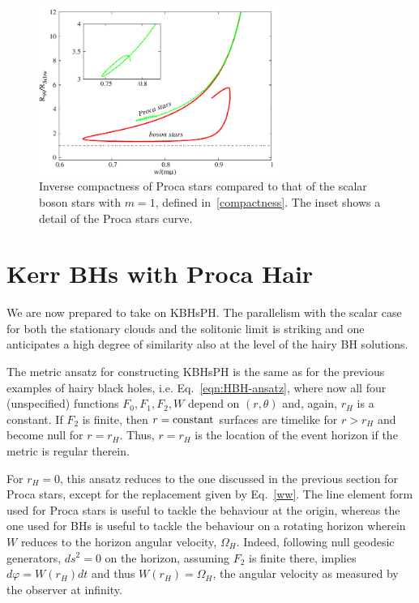 \begin{figure}[h!]
  \begin{center}
    \includegraphics[width=0.7\textwidth]{papers/Proca/w-Comp-Schw.pdf}  
         \end{center}
 \caption{Inverse compactness of Proca stars compared to that of the scalar boson stars with $m=1$, defined in~\eqref{compactness}. The inset shows a detail of the Proca stars curve.}
  \label{compactnessfig}
\end{figure}

\section{Kerr BHs with Proca Hair} 
\label{sec_kbhsph}

We are now prepared to take on KBHsPH.
The parallelism with the scalar case for both the stationary clouds and the solitonic limit is striking and one anticipates a high degree of similarity also at the level of the hairy BH solutions. 

The metric ansatz for constructing KBHsPH is the same as for the previous examples of hairy black holes, i.e. Eq.~\eqref{eqn:HBH-ansatz}, where now all four (unspecified) functions $F_0,F_1,F_2,W$ depend on $(r,\theta)$ and, again, $r_H$ is a constant.
If $F_2$ is finite, then $r={\rm constant}$ surfaces are timelike for $r>r_H$ and become null for $r=r_H$.
Thus, $r=r_H$ is the location of the event horizon if the metric is regular therein.

For $r_H=0$, this ansatz reduces to the one discussed in the previous section for Proca stars, except for the replacement given by Eq.~\eqref{ww}.
The line element form used for Proca stars is useful to tackle the behaviour at the origin, whereas the one used for BHs is useful to tackle the behaviour on a rotating horizon wherein $W$ reduces to the horizon angular velocity, $\Omega_H$.
Indeed, following null geodesic generators, $ds^2=0$ on the horizon, assuming $F_2$ is finite there, implies $d\varphi=W(r_H)dt$ and thus $W(r_H)=\Omega_H$, the angular velocity as measured by the observer at infinity.

